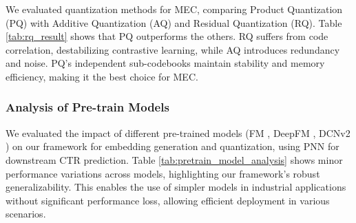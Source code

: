 

We evaluated quantization methods for MEC, comparing Product Quantization (PQ) with Additive Quantization (AQ) and Residual Quantization (RQ). Table \ref{tab:rq_result} shows that PQ outperforms the others. RQ suffers from code correlation, destabilizing contrastive learning, while AQ introduces redundancy and noise. PQ's independent sub-codebooks maintain stability and memory efficiency, making it the best choice for MEC.

\subsubsection{\textbf{Analysis of Pre-train Models}}


We evaluated the impact of different pre-trained models (FM \cite{FM}, DeepFM \cite{DeepFM}, DCNv2 \cite{DCNv2}) on our framework for embedding generation and quantization, using PNN for downstream CTR prediction. Table \ref{tab:pretrain_model_analysis} shows minor performance variations across models, highlighting our framework's robust generalizability. This enables the use of simpler models in industrial applications without significant performance loss, allowing efficient deployment in various scenarios.





        




